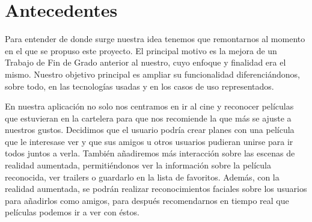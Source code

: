 


\section{Antecedentes}
\label{makereference1.1}

Para entender de donde surge nuestra idea tenemos que remontarnos al momento en el que se propuso este proyecto.
El principal motivo es la mejora de un Trabajo de Fin de Grado anterior
 al nuestro\cite{TFGRA16}, cuyo enfoque y finalidad era el mismo. Nuestro objetivo principal es 
 ampliar su funcionalidad diferenciándonos, sobre todo, en las tecnologías usadas y 
 en los casos de uso representados.

 En nuestra aplicación no solo nos centramos en ir al cine y reconocer películas que estuvieran en la cartelera
 para que nos recomiende la que más se ajuste a nuestros gustos. Decidimos que el usuario podría crear planes con
 una película que le interesase ver y que sus amigos u otros usuarios pudieran unirse para ir todos juntos a verla.
 También añadiremos más interacción sobre las escenas de realidad aumentada, permitiéndonos ver la información sobre la 
 película reconocida, ver trailers o guardarlo en la lista de favoritos. Además, con la realidad aumentada,
 se podrán realizar reconocimientos faciales sobre los usuarios para añadirlos como amigos, para después recomendarnos en tiempo real
 que películas podemos ir a ver con éstos.

